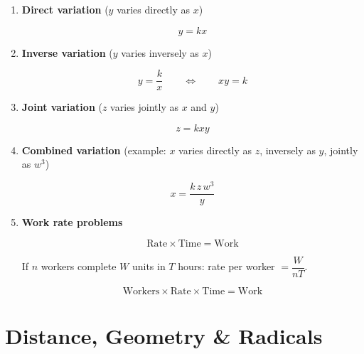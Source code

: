 \documentclass[10pt,letterpaper]{article}
\begin{document}
\begin{enumerate}

\item \textbf{Direct variation} ($y$ varies directly as $x$)

$$y = kx$$

\item \textbf{Inverse variation} ($y$ varies inversely as $x$)

$$y = \frac{k}{x} \qquad \Leftrightarrow \qquad xy = k$$

\item \textbf{Joint variation} ($z$ varies jointly as $x$ and $y$)

$$z = kxy$$

\item \textbf{Combined variation} (example: $x$ varies directly as $z$, inversely as $y$, jointly as $w^3$)

$$x = \frac{k\,z\,w^3}{y}$$

\item \textbf{Work rate problems}

$$\text{Rate} \times \text{Time} = \text{Work}$$

If $n$ workers complete $W$ units in $T$ hours: rate per worker $= \dfrac{W}{nT}$.

$$\text{Workers} \times \text{Rate} \times \text{Time} = \text{Work}$$

\end{enumerate}

\section{Distance, Geometry \& Radicals}
\end{document}
